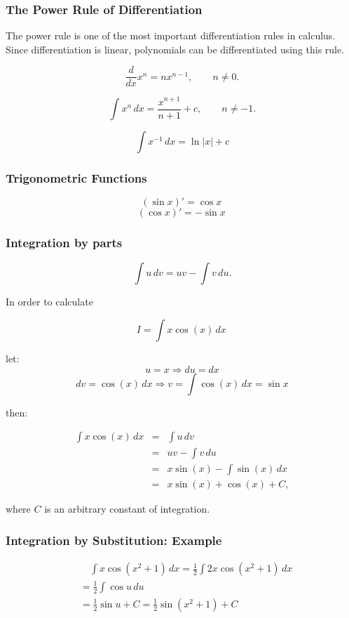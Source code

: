 \documentclass{beamer}
\begin{document}
	
	\begin{frame}
		\frametitle{The Power Rule of Differentiation}
		The power rule is one of the most important differentiation rules in calculus. Since differentiation is linear, polynomials can be differentiated using this rule.
		
		\[ \frac{d}{dx} x^n = nx^{n-1} , \qquad n \neq 0.\]
		
		\[\int\! x^n \,dx= \frac{ x^{n+1}}{n+1} + c, \qquad n \neq -1.\]
		
		\[\int \! x^{-1}\, dx= \ln |x|+ c\]
			\end{frame}
			\begin{frame}
		\frametitle{Trigonometric Functions}
		
		\[ (\sin x)' = \cos x \,\]
		\[ (\cos x)' = -\sin x \, \]
		
			\end{frame}
			\begin{frame}
		\frametitle{Integration by parts}
		
		\[ \int u \, dv=uv-\int v \, du. \]
			\end{frame}
			\begin{frame}
		
		In order to calculate
		
		\[I=\int x\cos (x) \,dx\,\]
		
		let:
		\[u = x \Rightarrow d u = dx\]
		\[dv = \cos(x)\,dx \Rightarrow v = \int\cos(x)\,dx = \sin x\]
		
		then:
			\end{frame}
			\begin{frame}
		\begin{eqnarray*}
			\int x\cos (x) \,dx & =& \int u \, dv \\
			& = & uv - \int v \, du \\
			& = & x\sin (x) - \int \sin (x) \,dx \\
			& = & x\sin (x) + \cos (x) + C,
		\end{eqnarray*}
		
		
		where $C$ is an arbitrary constant of integration.
			\end{frame}
			\begin{frame}
		\frametitle{Integration by Substitution: Example}
		
		\begin{eqnarray*}
			& {} \quad \int x \cos(x^2+1) \,dx = \frac{1}{2} \int 2x \cos(x^2+1) \,dx \\
			& {} = \frac{1}{2} \int\cos u\,du \\ & { }= \frac{1}{2}\sin u + C = \frac{1}{2}\sin(x^2+1) + C
		\end{eqnarray*}
			\end{frame}
\end{document}
